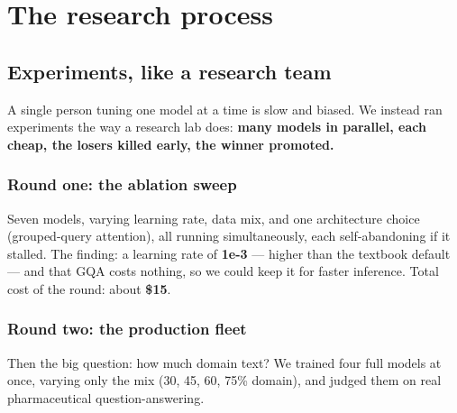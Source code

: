 \part{The research process}

\chapter{Experiments, like a research team}

A single person tuning one model at a time is slow and biased. We instead ran experiments the way a research
lab does: \textbf{many models in parallel, each cheap, the losers killed early, the winner promoted.}


\section{Round one: the ablation sweep}

\noindent Seven models, varying learning rate, data mix, and one architecture choice (grouped-query
attention), all running simultaneously, each self-abandoning if it stalled. The finding: a learning rate of
\textbf{1e-3} --- higher than the textbook default --- and that GQA costs nothing, so we could keep it for
faster inference. Total cost of the round: about \textbf{\$15}.

\section{Round two: the production fleet}

\noindent Then the big question: how much domain text? We trained four full models at once, varying only the
mix (30, 45, 60, 75\% domain), and judged them on real pharmaceutical question-answering.

